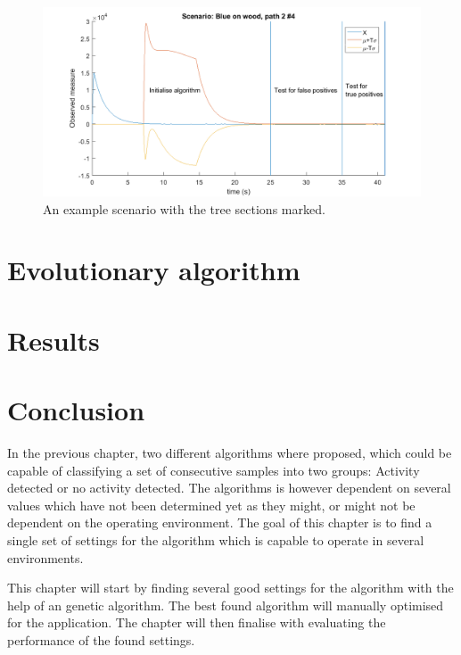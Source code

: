 \begin{figure}
	\centering     %
	\includegraphics[width=\textwidth]{pics/Examplescenario.png}
	\caption{An example scenario with the tree sections marked.\label{TestScenario}}
\end{figure}
\section{Evolutionary algorithm}

\section{Results}

\section{Conclusion}


%



In the previous chapter, two different algorithms where proposed, which could be capable of classifying a set of consecutive samples into two groups: Activity detected or no activity detected. The algorithms is however dependent on several values which have not been determined yet as they might, or might not be dependent on the operating environment. The goal of this chapter is to find a single set of settings for the algorithm which is capable to operate in several environments.

This chapter will start by finding several good settings for the algorithm with the help of an genetic algorithm. The best found algorithm will manually optimised for the application. The chapter will then finalise with evaluating the performance of the found settings.

